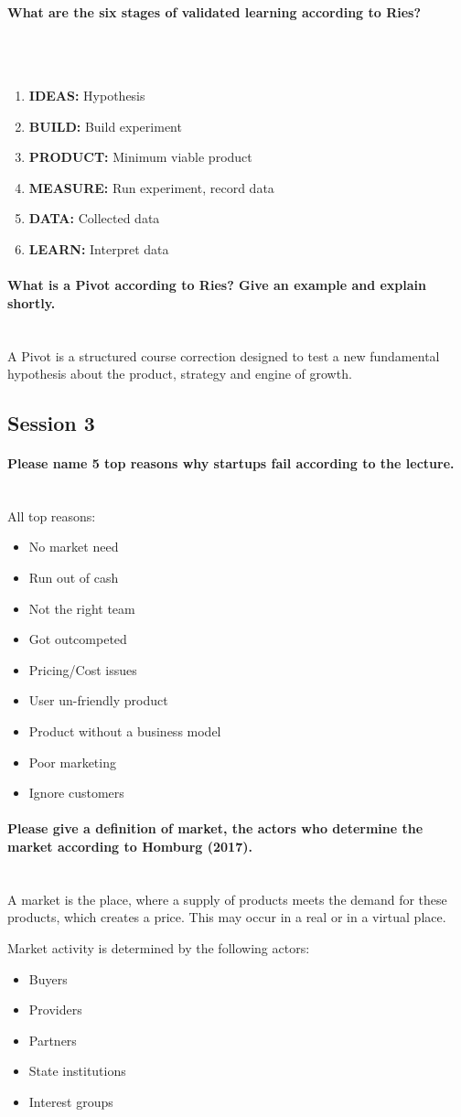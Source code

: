 \documentclass[10pt,a4paper,noendnumber=true]{scrartcl}
\newcommand{\properparagraph}[1]{\paragraph{\textcolor{Emerald}{#1}}\mbox{}\\}
\begin{document}
\properparagraph{What are the six stages of validated learning according to Ries?}
\\[-6ex]
\begin{enumerate}
	\item \textbf{IDEAS:} Hypothesis
	\item \textbf{BUILD:} Build experiment
	\item \textbf{PRODUCT:} Minimum viable product
	\item \textbf{MEASURE:} Run experiment, record data
	\item \textbf{DATA:} Collected data
	\item \textbf{LEARN:} Interpret data
\end{enumerate}

\properparagraph{What is a Pivot according to Ries? Give an example and explain shortly.}
A Pivot is a structured course correction designed to test a new fundamental hypothesis about the product, strategy and engine of growth.






\newpage
\subsection{Session 3}
\properparagraph{Please name 5 top reasons why startups fail according to the lecture.}
All top reasons:
\begin{itemize}
	\item No market need
	\item Run out of cash
	\item Not the right team
	\item Got outcompeted
	\item Pricing/Cost issues
	\item User un-friendly product
	\item Product without a business model
	\item Poor marketing
	\item Ignore customers
\end{itemize}

\properparagraph{Please give a definition of market, the actors who determine the market according to Homburg	(2017).}
A market is the place, where a supply of products meets the demand for these products, which creates a price. This may occur in a real or in a virtual place.

Market activity is determined by the following actors:
\begin{itemize}
	\item Buyers
	\item Providers
	\item Partners
	\item State institutions
	\item Interest groups
\end{itemize}
\end{document}
